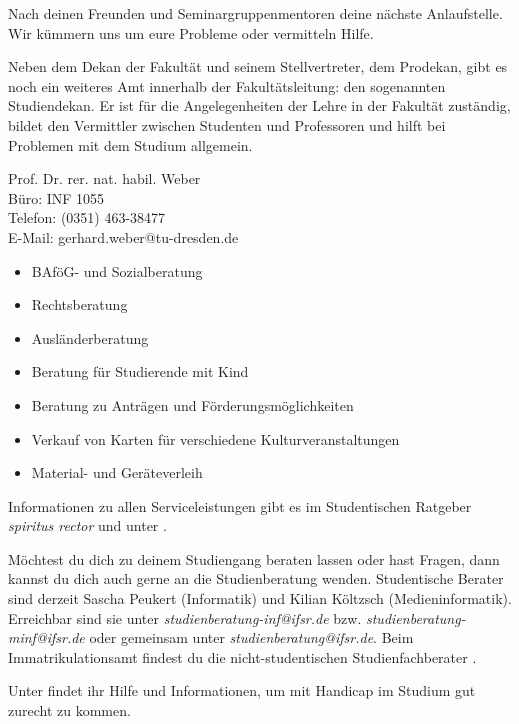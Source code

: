 
Nach deinen Freunden und Seminargruppenmentoren deine nächste Anlaufstelle.
Wir kümmern uns um eure Probleme oder vermitteln Hilfe.

Neben dem Dekan der Fakultät und seinem Stellvertreter, dem Prodekan, gibt es noch ein weiteres Amt innerhalb der Fakultätsleitung:
den sogenannten Studiendekan.
Er ist für die Angelegenheiten der Lehre in der Fakultät zuständig, bildet den Vermittler zwischen Studenten und Professoren und hilft bei Problemen mit dem Studium allgemein.

Prof. Dr. rer. nat. habil. Weber \\
Büro: INF 1055 \\
Telefon: (0351) 463-38477 \\
E-Mail: gerhard.weber@tu-dresden.de \\

\begin{itemize}
\item BAföG- und Sozialberatung
\item Rechtsberatung
\item Ausländerberatung
\item Beratung für Studierende mit Kind
\item Beratung zu Anträgen und Förderungsmöglichkeiten
\item Verkauf von Karten für verschiedene Kulturveranstaltungen
\item Material- und Geräteverleih
\end{itemize}

Informationen zu allen Serviceleistungen gibt es im Studentischen Ratgeber \textit{spiritus rector}  und unter .

Möchtest du dich zu deinem Studiengang beraten lassen oder hast Fragen, dann kannst du dich auch gerne an die Studienberatung wenden.
Studentische Berater sind derzeit Sascha Peukert (Informatik) und Kilian Költzsch (Medieninformatik).
Erreichbar sind sie unter \textit{studienberatung-inf@ifsr.de} bzw. \textit{studienberatung-minf@ifsr.de} oder gemeinsam unter \textit{studienberatung@ifsr.de}.
Beim Immatrikulationsamt findest du die nicht-studentischen Studienfachberater .

Unter  findet ihr Hilfe und Informationen, um mit Handicap im Studium gut zurecht zu kommen.


